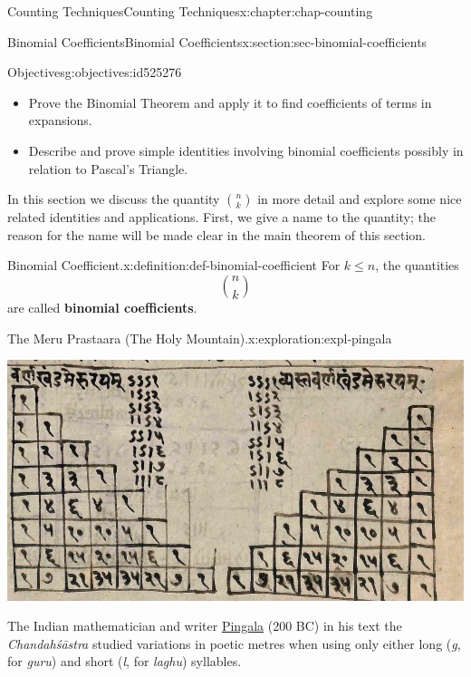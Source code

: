 \documentclass[oneside,10pt,]{book}
\newcommand{\terminology}[1]{\textbf{#1}}
\newcommand{\pubtitle}[1]{\textsl{#1}}
\numberwithin{equation}{section}
\begin{document}
\begin{chapterptx}{Counting Techniques}{}{Counting Techniques}{}{}{x:chapter:chap-counting}
%
\begin{sectionptx}{Binomial Coefficients}{}{Binomial Coefficients}{}{}{x:section:sec-binomial-coefficients}
\begin{objectives}{Objectives}{g:objectives:id525276}
%
\begin{itemize}[label=\textbullet]
\item{}Prove the Binomial Theorem and apply it to find coefficients of terms in expansions.%
\item{}Describe and prove simple identities involving binomial coefficients possibly in relation to Pascal's Triangle.%
\end{itemize}
\end{objectives}
In this section we discuss the quantity \(\displaystyle\binom{n}{k}\) in more detail and explore some nice related identities and applications. First, we give a name to the quantity; the reason for the name will be made clear in the main theorem of this section.%
\begin{definition}{Binomial Coefficient.}{x:definition:def-binomial-coefficient}%
For \(k \leq n\), the quantities%
\begin{equation*}
\binom{n}{k}
\end{equation*}
are called \terminology{binomial coefficients}.%
\end{definition}
\begin{exploration}{The Meru Prastaara (The Holy Mountain).}{x:exploration:expl-pingala}%
\begin{sidebyside}{1}{0.175}{0.175}{0}%
\begin{sbspanel}{0.65}%
\includegraphics[width=\linewidth]{figs/meru-prastaara.png}
\end{sbspanel}%
\end{sidebyside}%
\par
The Indian mathematician and writer \href{https://en.wikipedia.org/wiki/Pingala}{Pingala} (200 BC) in his text the \pubtitle{Chandahśāstra} studied variations in poetic metres when using only either long (\emph{g}, for \emph{guru}) and short (\emph{l}, for \emph{laghu}) syllables.%

\end{exploration}
\end{sectionptx}
\end{chapterptx}
\end{document}
